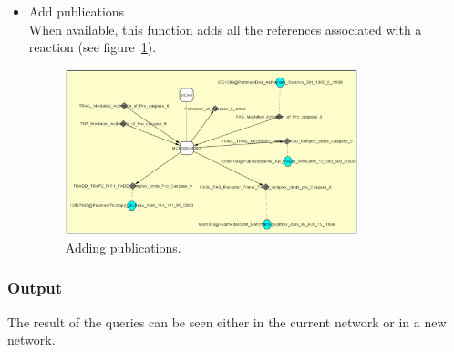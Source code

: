 \begin{itemize}
\item Add publications\\
When available, this function adds all the references associated with a reaction (see figure~\ref{Standard_Query_Adding_publications}).
\begin{figure}[h]
\centering
\includegraphics[width=0.8\textwidth]{graphics/Standard_Query_Adding_publications}
\caption{Adding publications.}
\label{Standard_Query_Adding_publications}
\end{figure}
\end{itemize}
\subsubsection{Output}
The result of the queries can be seen either in the current network or in a new network.

